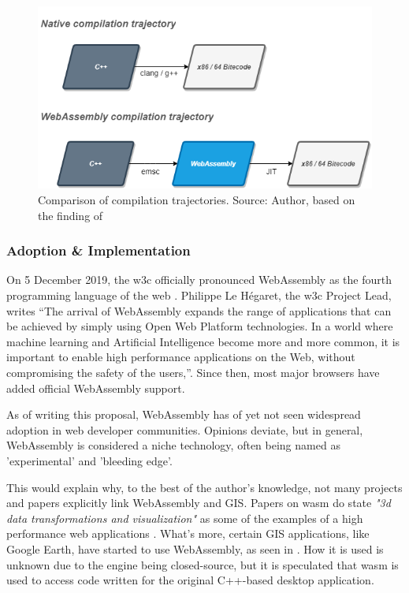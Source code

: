 \begin{figure}[!tbp]
  \centering
  \begin{minipage}[b]{0.80\textwidth}
    \includegraphics[width=\textwidth]{../schemas/wasm-performance/wasm-perf.png}
    \caption{Comparison of compilation trajectories. Source: Author, based on the finding of \cite{jangda_not_2019}}
    \label{fig:wasm-trajectory}
  \end{minipage}
\end{figure}

\subsubsection*{Adoption \& Implementation}

On 5 December 2019, the \ac{w3c} officially pronounced WebAssembly as the fourth programming language of the web \cite{w3c_world_2019}. Philippe Le Hégaret, the \ac{w3c} Project Lead, writes “The arrival of WebAssembly expands the range of applications that can be achieved by simply using Open Web Platform technologies. In a world where machine learning and Artificial Intelligence become more and more common, it is important to enable high performance applications on the Web, without compromising the safety of the users,”. Since then, most major browsers have added official WebAssembly support.

As of writing this proposal, WebAssembly has of yet not seen widespread adoption in web developer communities. Opinions deviate, but in general, WebAssembly is considered a niche technology, often being named as 'experimental' and 'bleeding edge'. 

This would explain why, to the best of the author's knowledge, not many projects and papers explicitly link WebAssembly and GIS. Papers on \ac{wasm} do state \textit{"3d data transformations and visualization"} as some of the examples of a high performance web applications \cite{haas_bringing_2017, jangda_not_2019}. What's more, certain GIS applications, like Google Earth, have started to use WebAssembly, as seen in  \cite{google_google_2020}. How it is used is unknown due to the engine being closed-source, but it is speculated that \ac{wasm} is used to access code written for the original C++-based desktop application.

